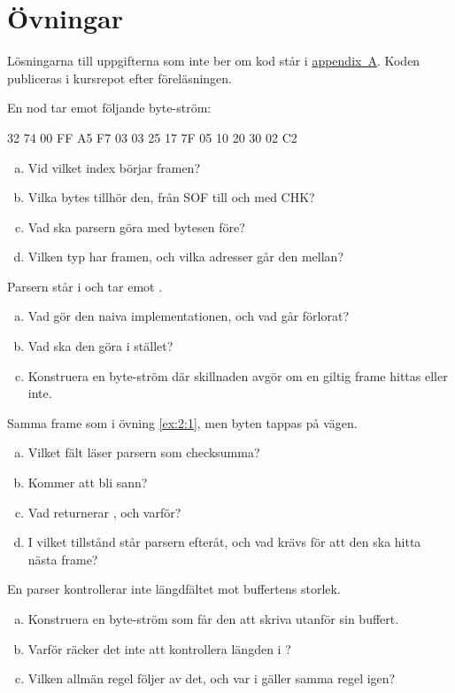 \section*{Övningar}

Lösningarna till uppgifterna som inte ber om kod står i \hyperref[ch:losningar]{appendix~A}.
Koden publiceras i kursrepot efter föreläsningen.

\label{ex:2:1}
En nod tar emot följande byte-ström:

\begin{console}
32 74 00 FF A5 F7 03 03 25 17 7F 05 10 20 30 02 C2
\end{console}

\begin{enumerate}[a)]
  \item Vid vilket index börjar framen?
  \item Vilka bytes tillhör den, från SOF till och med CHK?
  \item Vad ska parsern göra med bytesen före?
  \item Vilken typ har framen, och vilka adresser går den mellan?
\end{enumerate}

\label{ex:2:2}
Parsern står i  och tar emot .
\begin{enumerate}[a)]
  \item Vad gör den naiva implementationen, och vad går förlorat?
  \item Vad ska den göra i stället?
  \item Konstruera en byte-ström där skillnaden avgör om en giltig frame hittas eller inte.
\end{enumerate}

\label{ex:2:3}
Samma frame som i övning \ref{ex:2:1}, men byten  tappas på vägen.
\begin{enumerate}[a)]
  \item Vilket fält läser parsern som checksumma?
  \item Kommer  att bli sann?
  \item Vad returnerar , och varför?
  \item I vilket tillstånd står parsern efteråt, och vad krävs för att den ska hitta nästa frame?
\end{enumerate}

\label{ex:2:4}
En parser kontrollerar inte längdfältet mot buffertens storlek.
\begin{enumerate}[a)]
  \item Konstruera en byte-ström som får den att skriva utanför sin buffert.
  \item Varför räcker det inte att kontrollera längden i ?
  \item Vilken allmän regel följer av det, och var i  gäller samma regel igen?
\end{enumerate}
